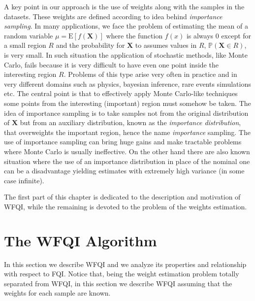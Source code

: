   \noindent A key point in our approach is the use of weights along with the samples in the datasets. These weights
  are defined according to idea behind \textit{importance sampling}.\newline
  In many applications, we face the problem of estimating the mean of a random variable $\mu = \mathrm{E}[f(\pmb{X})]$
  where the function $f(x)$ is always 0 except for a small region $R$ and the probability for $\pmb{X}$ to
  assumes values in $R$, $\mathbb{P}(\pmb{X} \in R)$, is very small.\newline
  In such situation the application of stochastic methods, like Monte Carlo, fails because it is very difficult to have
  even one point inside the interesting region $R$. Problems of this type arise very often in practice and in very
  different domains such as physics, bayesian inference, rare events simulations etc.\newline
  The central point is that to effectively apply Monte Carlo-like techniques some points from the interesting (important)
  region must somehow be taken. The idea of importance sampling is to take samples not from the original distribution
  of $\pmb{X}$ but from an auxiliary distribution, known as the \textit{importance distribution}, that overweights the important
  region, hence the name \textit{importance} sampling.\newline
  \noindent The use of importance sampling can bring huge gains and make tractable problems where Monte Carlo is
  usually ineffective. On the other hand there are also known situation where the use of an importance distribution
  in place of the nominal one can be a disadvantage yielding estimates with extremely high variance (in some case infinite).\newline

  \noindent The first part of this chapter is dedicated to the description and motivation of WFQI, while the remaining is
  devoted to the problem of the weights estimation.

  \vspace{3cm}
  \section{The WFQI Algorithm}
    \noindent In this section we describe WFQI and we analyze its properties and relationship with respect to FQI.
    Notice that, being the weight estimation problem totally separated from WFQI, in this section we describe
    WFQI assuming that the weights for each sample are known.

